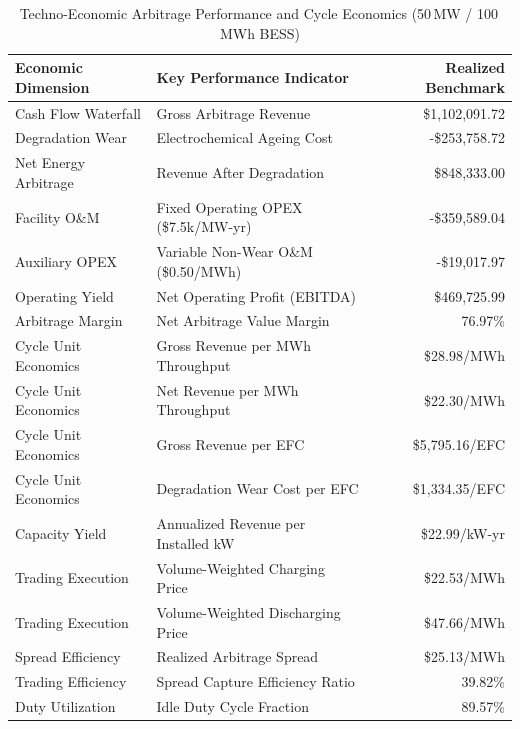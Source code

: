 \begin{table}[htbp]
\centering
\small
\caption{Techno-Economic Arbitrage Performance and Cycle Economics (50\,MW / 100\,MWh BESS)}
\label{tab:arbitrage_economics}
\begin{tabular}{llr}
\toprule
\textbf{Economic Dimension} & \textbf{Key Performance Indicator} & \textbf{Realized Benchmark} \\
\midrule
Cash Flow Waterfall & Gross Arbitrage Revenue & \$1,102,091.72 \\
Degradation Wear & Electrochemical Ageing Cost & -\$253,758.72 \\
Net Energy Arbitrage & Revenue After Degradation & \$848,333.00 \\
Facility O\&M & Fixed Operating OPEX (\$7.5k/MW-yr) & -\$359,589.04 \\
Auxiliary OPEX & Variable Non-Wear O\&M (\$0.50/MWh) & -\$19,017.97 \\
Operating Yield & Net Operating Profit (EBITDA) & \$469,725.99 \\
Arbitrage Margin & Net Arbitrage Value Margin & 76.97\% \\
\midrule
Cycle Unit Economics & Gross Revenue per MWh Throughput & \$28.98/MWh \\
Cycle Unit Economics & Net Revenue per MWh Throughput & \$22.30/MWh \\
Cycle Unit Economics & Gross Revenue per EFC & \$5,795.16/EFC \\
Cycle Unit Economics & Degradation Wear Cost per EFC & \$1,334.35/EFC \\
Capacity Yield & Annualized Revenue per Installed kW & \$22.99/kW-yr \\
\midrule
Trading Execution & Volume-Weighted Charging Price & \$22.53/MWh \\
Trading Execution & Volume-Weighted Discharging Price & \$47.66/MWh \\
Spread Efficiency & Realized Arbitrage Spread & \$25.13/MWh \\
Trading Efficiency & Spread Capture Efficiency Ratio & 39.82\% \\
Duty Utilization & Idle Duty Cycle Fraction & 89.57\% \\
\bottomrule
\end{tabular}
\end{table}
